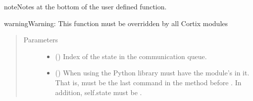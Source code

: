 \documentclass[letterpaper,10pt,openany,oneside,english]{sphinxmanual}
\begin{document}
\begin{fulllineitems}
\begin{fulllineitems}
\begin{sphinxadmonition}{note}{Notes}
at the bottom of the user defined  function.
\end{sphinxadmonition}

\begin{sphinxadmonition}{warning}{Warning:}
This function must be overridden by all Cortix modules
\end{sphinxadmonition}
\begin{quote}\begin{description}
\item[{Parameters}] \leavevmode\begin{itemize}
\item {} 
\sphinxstyleliteralstrong{\sphinxupquote{{[}}}\sphinxstyleliteralstrong{\sphinxupquote{{]}}} () \textendash{} Index of the state in the communication queue.

\item {} 
\sphinxstyleliteralstrong{\sphinxupquote{{[}}}\sphinxstyleliteralstrong{\sphinxupquote{{]}}} () \textendash{} When using the Python  library  must have
the module’s  in it. That is,
 must be the last command in the
method before . In addition, self.state must be .

\end{itemize}

\end{description}\end{quote}

\end{fulllineitems}


\end{fulllineitems}

\end{document}
